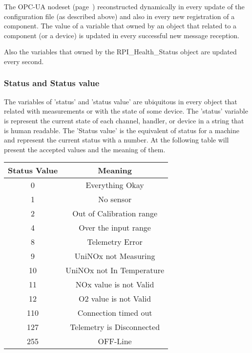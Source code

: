 The OPC-UA nodeset (page~\pageref{tree:OPC_UA_nodeset}) reconstructed dynamically in every update of the configuration file (as described above) and also in every new registration of a component.
The value of a variable that owned by an object that related to a component (or a device) is updated in every successful new message reception.

Also the variables that owned by the RPI\_Health\_Status object are updated every second.

\subsubsection{Status and Status value}
 The variables of 'status' and 'status value' are ubiquitous in every object that related with measurements or with the state of some device.
 The 'status' variable is represent the current state of each channel, handler, or device in a string that is human readable. The 'Status value' is the equivalent of status for a machine
 and represent the current status with a number. At the following table will present the accepted values and the meaning of them.
 \begin{center}
 \begin{tabular}{||c | c||}
 \hline
 Status Value & Meaning \\ [0.5ex]
 \hline\hline
 0 & Everything Okay \\
 \hline
 1 & No sensor\\
 \hline
 2 & Out of Calibration range\\
 \hline
 4 & Over the input range\\
 \hline
 8 & Telemetry Error\\
 \hline
 9 & UniNOx not Measuring\\
 \hline
 10 & UniNOx not In Temperature\\
 \hline
 11 & NOx value is not Valid\\
 \hline
 12 & O2 value is not Valid\\
 \hline
 110 & Connection timed out\\
 \hline
 127 & Telemetry is Disconnected\\
 \hline
 255 & OFF-Line\\
 \hline
\end{tabular}
\end{center}
